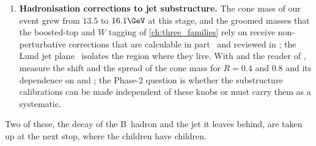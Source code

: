 \begin{enumerate}
    computing budget of \cite{HSFPhysicsEventGeneratorWG:2020gxw}.
  \item \textbf{Hadronisation corrections to jet substructure.} The cone
    mass of our event grew from $13.5$ to $16.1\GeV$ at this stage, and
    the groomed masses that the boosted-top and $W$ tagging of
    \cref{ch:three_families} rely on receive non-perturbative corrections
    that are calculable in part~\cite{Hoang:2019ceu} and reviewed in
    \cite{Larkoski:2017jix}; the Lund jet plane~\cite{Dreyer:2018nbf}
    isolates the region where they live. With  and the
    reader of , measure the shift and the spread
    of the cone mass for $R=0.4$ and $0.8$ and its dependence on
     and ; the Phase-2 question is whether the
    substructure calibrations can be made independent of these knobs or
    must carry them as a systematic.
\end{enumerate}
Two of these, the decay of the B~hadron and the jet it leaves behind, are
taken up at the next stop, where the children have children.
